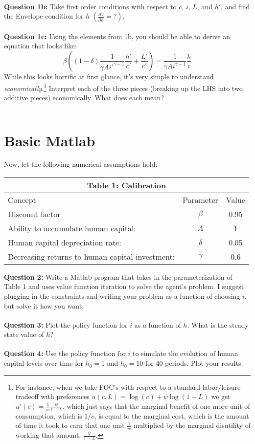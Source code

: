 \documentclass[11pt]{article}
\begin{document}
\ \\
\textbf{Question 1b:} Take first order conditions with respect to $c$, $i$, $L$, and $h'$, and find the Envelope condition for $h$ $\left(\frac{\partial V}{\partial h}=?\right)$.\\
 \ \\

\textbf{Question 1c:} Using the elements from 1b, you should be able to derive an equation that looks like: $$\beta \left((1-\delta)\frac{1}{\gamma A i'^{\gamma-1}}\frac{h'}{c'}+\frac{L'}{c'}\right)=\frac{1}{\gamma A i^{\gamma-1}}\frac{h}{c}$$
While this looks horrific at first glance, it's very simple to understand \emph{economically}.\footnote{For instance, when we take FOC's with respect to a standard labor/leisure tradeoff with preferences $u(c,L)=\log(c)+\psi\log(1-L)$ we get $u'(c)=\frac{1}{w}\frac{\psi}{1-L}$, which just says that the marginal benefit of one more unit of consumption, which is $1/c$, is equal to the marginal cost, which is the amount of time it took to earn that one unit $\frac{1}{w}$ multiplied by the marginal disutility of working that amount, $\frac{\psi}{1-L}$.}  Interpret each of the three pieces (breaking up the LHS into two additive pieces) economically. What does each mean?\\
 \ \\

\clearpage
\section{Basic Matlab}
Now, let the following numerical assumptions hold:
\begin{table}[ht!]
\centering
\begin{tabular}{lcc}
\hline
\hline
\multicolumn{3}{c}{Table 1: Calibration}\\
\hline
Concept & Parameter & Value \\ 
Discount factor & $\beta$ & 0.95\\
Ability to accumulate human capital: & $A$  & 1\\
Human capital depreciation rate: & $\delta$  & 0.05\\
Decreasing returns to human capital investment: &  $\gamma$  & 0.6\\
\hline
\hline
\end{tabular}
\end{table}

\textbf{Question 2:} Write a Matlab program that takes in the parameterization of Table 1 and uses value function iteration to solve the agent's problem.  I suggest plugging in the constraints and writing your problem as a function of choosing $i$, but solve it how you want.\\
\ \\

\textbf{Question 3:} Plot the policy function for $i$ as a function of $h$.  What is the steady state value of $h$?\\
\ \\

\textbf{Question 4:} Use the policy function for $i$ to simulate the evolution of human capital levels over time for $h_0=1$ and $h_0=10$ for 40 periods.  Plot your results.\\
\end{document}
